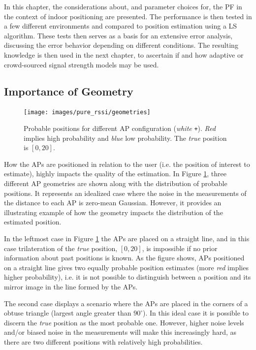 \documentclass{LTHthesis}
\begin{document}
In this chapter, the considerations about, and parameter choices for, the PF in the context of indoor positioning are presented. The performance is then tested in a few different environments and compared to position estimation using a LS algorithm.  These tests then serves as a basis for an extensive error analysis, discussing the error behavior depending on different conditions. The resulting knowledge is then used in the next chapter, to ascertain if and how adaptive or crowd-sourced signal strength models may be used.
%
\subsection{Importance of Geometry}
%
\begin{figure}[!hbt]

\texttt{[image: images/pure\_rssi/geometries]}
\caption{Probable positions for different AP configuration (\emph{white} \texttt{+}). \emph{Red} implies high probability and \emph{blue} low probability. The \emph{true} position is $[0, 20]$.}\label{geometries}
\end{figure}
%
How the APs are positioned in relation to the user (i.e. the position of interest to estimate), highly impacts the quality of the estimation. In Figure \ref{geometries}, three different AP geometries are shown along with the distribution of probable positions. It represents an idealized case where the noise in the measurements of the distance to each AP is zero-mean Gaussian. However, it provides an illustrating example of how the geometry impacts the distribution of the estimated position.

In the leftmost case in Figure \ref{geometries} the APs are placed on a straight line, and in this case trilateration of the \emph{true} position, $[0,20]$, is impossible if no prior information about past positions is known. As the figure shows, APs positioned on a straight line gives two equally probable position estimates (more \emph{red} implies higher probability), i.e. it is not possible to distinguish between a position and its mirror image in the line formed by the APs. 

The second case displays a scenario where the APs are placed in the corners of a obtuse triangle (largest angle greater than $90^\circ$). In this ideal case it is possible to discern the \emph{true} position as the most probable one. However, higher noise levels and/or biased noise in the measurements will make this increasingly hard, as there are two different positions with relatively high probabilities.
\end{document}
